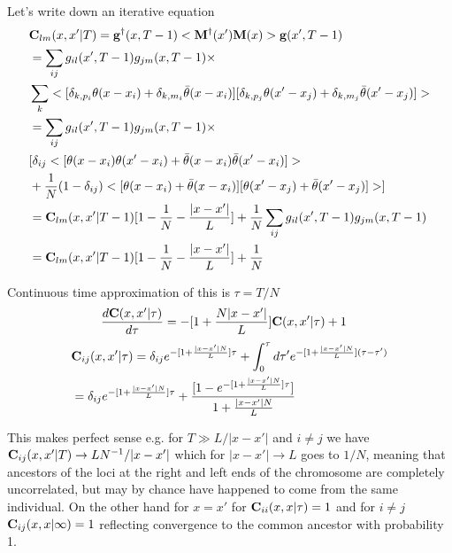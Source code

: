 \documentclass{article}
\begin{document}
Let's write down an iterative equation
\begin{eqnarray}
&{\bf C}_{lm}(x,x'|T)= {\bf g}^{\dagger}(x,T-1)<{\bf M} ^{\dagger}(x'){\bf M} (x)>{\bf g}(x',T-1)\\
&= \sum_{ij} g_{il}(x',T-1) g_{jm}(x,T-1) \times \\
&\sum_k <[\delta_{k,p_i}\theta(x-x_i)+\delta_{k,m_i}{\bar \theta}(x-x_i)][\delta_{k,p_j}\theta(x'-x_j)+\delta_{k,m_j}{\bar \theta}(x'-x_j)]>\\
&= \sum_{ij} g_{il}(x',T-1) g_{jm}(x,T-1) \times \\
& [ \delta_{ij} <[\theta(x-x_i)\theta(x'-x_i)+{\bar \theta}(x-x_i){\bar \theta}(x'-x_i)]>  \\
&+  {1 \over N} (1-\delta_{ij})<[\theta(x-x_i)+{\bar \theta}(x-x_i)][\theta(x'-x_j)+{\bar \theta}(x'-x_j)]> ]\\
&= {\bf C}_{lm}(x,x'|T-1) [1-{1 \over N} -{|x-x'| \over L}]+{1 \over N} \sum_{ij} g_{il}(x',T-1) g_{jm}(x,T-1)\\
&= {\bf C}_{lm}(x,x'|T-1) [1-{1 \over N} -{|x-x'| \over L}]+{1 \over N}
\end{eqnarray}

Continuous time approximation of this is $\tau = T/N$
\begin{eqnarray}
&{d {\bf C}(x,x'|\tau)\over d\tau} = -[1+{N|x-x'| \over L}]{\bf C}(x,x'|\tau)+1
\end{eqnarray}
\begin{eqnarray}
&{\bf C}_{ij}(x,x'|\tau)= \delta_{ij}  e^{-[1+{|x-x'| N \over L }]\tau} +  \int_0^{\tau} d\tau' e^{-[1+{|x-x'|  N\over L}](\tau-\tau')}\\
&= \delta_{ij}  e^{-[1+{|x-x'| N \over L }]\tau}+ { [ 1- e^{-[1+{|x-x'| N \over L }]\tau}] \over 1+{|x-x'| N \over L } } 
\end{eqnarray}

This makes perfect sense e.g. for $T \gg L/|x-x'|$
 and $i \neq j$ we have $ {\bf C}_{ij}(x,x'|T)\rightarrow LN^{-1} /|x-x'|$ which for $|x-x'| \rightarrow L$ goes to $1/N$, meaning that ancestors of the loci at the right and left ends of the chromosome are completely uncorrelated, but may by chance have happened to come from the same individual. On the other hand for $x = x'$ for ${\bf C}_{ii}(x,x|\tau)=1$ and for $i \neq j$  ${\bf C}_{ij}(x,x|\infty)=1$ reflecting convergence to the common ancestor with probability 1.
 
\end{document}
